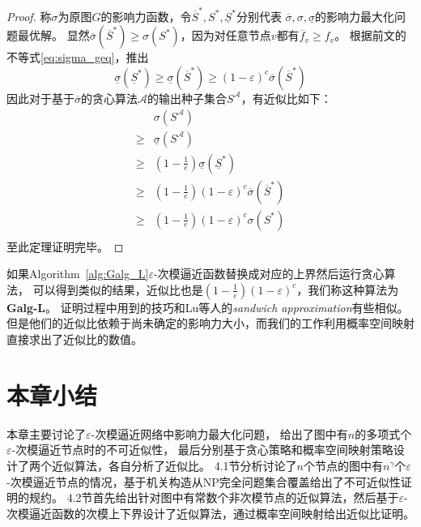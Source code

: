 \begin{proof}
称$\sigma$为原图$G$的影响力函数，令$\overline{S}^*,S^*,\underline{S}^*$分别代表
$\overline{\sigma}, \sigma, \underline{\sigma}$的影响力最大化问题最优解。
显然$\overline{\sigma}(\overline{S}^*) \geq \sigma(S^*)$，因为对任意节点$v$都有$\overline{f}_v \geq f_v$。
根据前文的不等式\ref{eq:sigma_geq}，推出
$$\underline{\sigma}(\underline{S}^*)
\geq \underline{\sigma}(\overline{S}^*)
\geq (1-\varepsilon)^c \overline{\sigma}(\overline{S}^*)$$
因此对于基于$\overline{\sigma}$的贪心算法$\mathcal{A}$的输出种子集合$S^{\mathcal{A}}$，有近似比如下：
\begin{equation*}
\begin{array}{ll}
& \sigma(S^{\mathcal{A}}) \\
\geq & \underline{\sigma}(S^{\mathcal{A}}) \\
\geq & (1-\frac{1}{e})\underline{\sigma}(\underline{S}^*)\\
\geq & (1-\frac{1}{e})(1-\varepsilon)^c \overline{\sigma}(\overline{S}^*) \\
\geq &(1-\frac{1}{e})(1-\varepsilon)^c \sigma(S^*) \\
\end{array}
\end{equation*}
至此定理证明完毕。
\end{proof}

如果Algorithm~\ref{alg:Galg_L}$\varepsilon$-次模逼近函数替换成对应的上界然后运行贪心算法，
可以得到类似的结果，近似比也是$(1-\frac{1}{e})(1-\varepsilon)^c$，我们称这种算法为\textbf{Galg-L}。
证明过程中用到的技巧和Lu等人\cite{lu2015competition}的{\em sandwich approximation}有些相似。
但是他们的近似比依赖于尚未确定的影响力大小，而我们的工作利用概率空间映射直接求出了近似比的数值。


\section{本章小结}
本章主要讨论了$\varepsilon$-次模逼近网络中影响力最大化问题，
给出了图中有$n$的多项式个$\varepsilon$-次模逼近节点时的不可近似性，
最后分别基于贪心策略和概率空间映射策略设计了两个近似算法，各自分析了近似比。
4.1节分析讨论了$n$个节点的图中有$n^{\gamma}$个$\varepsilon$-次模逼近节点的情况，基于机关构造从NP完全问题集合覆盖给出了不可近似性证明的规约。
4.2节首先给出针对图中有常数个非次模节点的近似算法，然后基于$\varepsilon$-次模逼近函数的次模上下界设计了近似算法，通过概率空间映射给出近似比证明。







